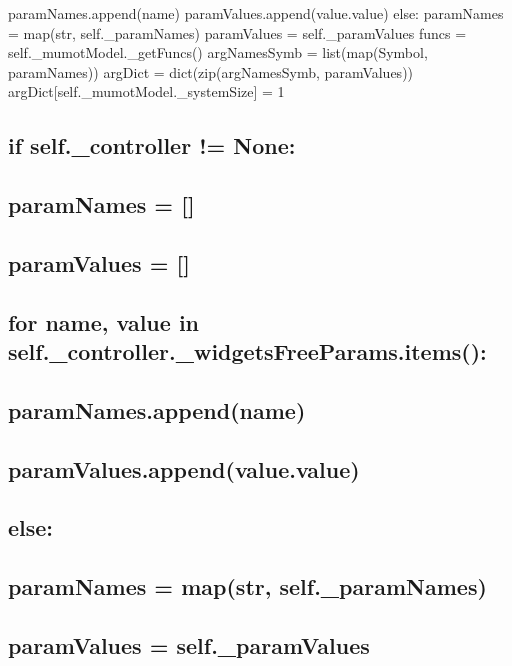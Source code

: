 param\+Names.\+append(name) param\+Values.\+append(value.\+value) else\+: param\+Names = map(str, self.\+\_\+param\+Names) param\+Values = self.\+\_\+param\+Values funcs = self.\+\_\+mumot\+Model.\+\_\+get\+Funcs() arg\+Names\+Symb = list(map(\+Symbol, param\+Names)) arg\+Dict = dict(zip(arg\+Names\+Symb, param\+Values)) arg\+Dict\mbox{[}self.\+\_\+mumot\+Model.\+\_\+system\+Size\mbox{]} = 1

\subsection*{if self.\+\_\+controller != None\+:}

\subsection*{param\+Names = \mbox{[}\mbox{]}}

\subsection*{param\+Values = \mbox{[}\mbox{]}}

\subsection*{for name, value in self.\+\_\+controller.\+\_\+widgets\+Free\+Params.\+items()\+:}

\subsection*{param\+Names.\+append(name)}

\subsection*{param\+Values.\+append(value.\+value)}

\subsection*{else\+:}

\subsection*{param\+Names = map(str, self.\+\_\+param\+Names)}

\subsection*{param\+Values = self.\+\_\+param\+Values}

